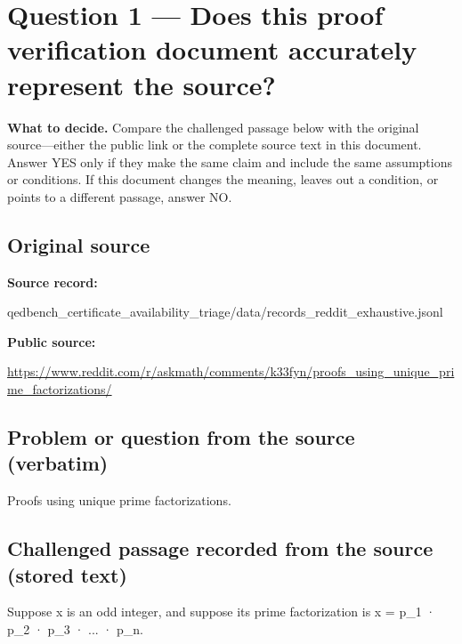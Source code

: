 \documentclass[11pt]{article}
\begin{document}
\section*{Question 1 --- Does this proof verification document accurately represent the source?}
\textbf{What to decide.} Compare the challenged passage below with the original source---either the public link or the complete source text in this document. Answer YES only if they make the same claim and include the same assumptions or conditions. If this document changes the meaning, leaves out a condition, or points to a different passage, answer NO.
\subsection*{Original source}
\textbf{Source record:}
\begin{Vsrc}
qedbench_certificate_availability_triage/data/records_reddit_exhaustive.jsonl
\end{Vsrc}
\textbf{Public source:}\par
\url{https://www.reddit.com/r/askmath/comments/k33fyn/proofs_using_unique_prime_factorizations/}\par
\subsection*{Problem or question from the source (verbatim)}
\begin{Vsrc}
Proofs using unique prime factorizations.
\end{Vsrc}
\subsection*{Challenged passage recorded from the source (stored text)}
\begin{Vsrc}
Suppose x is an odd integer, and suppose its prime factorization is x = p\_1 · p\_2 · p\_3 · ... · p\_n.
\end{Vsrc}
\end{document}
